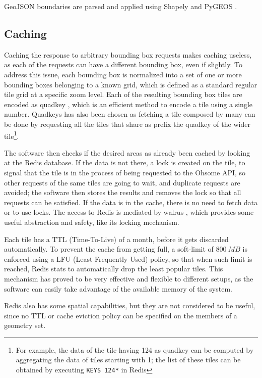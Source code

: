 \documentclass{Configuration_Files/PoliMi3i_thesis}
\begin{document}
GeoJSON boundaries are parsed and applied using Shapely \cite{Shapely2022} and PyGEOS \cite{PyGEOS2022}.

\subsection{Caching}

Caching the response to arbitrary bounding box requests makes caching useless, as each of the requests can have a different bounding box, even if slightly. To address this issue, each bounding box is normalized into a set of one or more bounding boxes belonging to a known grid, which is defined as a standard regular tile grid at a specific zoom level.
Each of the resulting bounding box tiles are encoded as quadkey \cite{rbrundrittBingMapsTile}, which is an efficient method to encode a tile using a single number. Quadkeys has also been chosen as fetching a tile composed by many can be done by requesting all the tiles that share as prefix the quadkey of the wider tile\footnote{For example, the data of the tile having 124 as quadkey can be computed by aggregating the data of tiles starting with 1; the list of these tiles can be obtained by executing \verb+KEYS 124*+  in Redis}.

The software then checks if the desired areas as already been cached by looking at the Redis database. If the data is not there, a lock is created on the tile, to signal that the tile is in the process of being requested to the Ohsome API, so other requests of the same tiles are going to wait, and duplicate requests are avoided; the software then stores the results and removes the lock so that all requests can be satisfied. If the data is in the cache, there is no need to fetch data or to use locks. The access to Redis is mediated by walrus \cite{leiferColeiferWalrus2022}, which provides some useful abstraction and safety, like its locking mechanism.

Each tile has a TTL (Time-To-Live) of a month, before it gets discarded automatically. To prevent the cache from getting full, a soft-limit of $ \SI{800}{MB} $ is enforced using a LFU (Least Frequently Used) policy, so that when such limit is reached, Redis stats to automatically drop the least popular tiles. This mechanism has proved to be very effective and flexible to different setups, as the software can easily take advantage of the available memory of the system.

Redis also has some spatial capabilities, but they are not considered to be useful, since no TTL or cache eviction policy can be specified on the members of a geometry set. 
\end{document}
